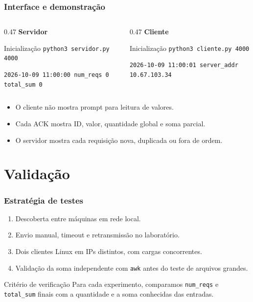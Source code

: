 \documentclass{beamer}
\begin{document}
\begin{frame}
  \frametitle{Interface e demonstração}
  \begin{columns}[T]
    \begin{column}{0.47\textwidth}
      \textbf{Servidor}
      \begin{exampleblock}{Inicialização}
        \texttt{python3 servidor.py 4000}
      \end{exampleblock}
      \small
      \texttt{2026-10-09 11:00:00 num\_reqs 0 total\_sum 0}
    \end{column}
    \begin{column}{0.47\textwidth}
      \textbf{Cliente}
      \begin{exampleblock}{Inicialização}
        \texttt{python3 cliente.py 4000}
      \end{exampleblock}
      \small
      \texttt{2026-10-09 11:00:01 server\_addr 10.67.103.34}
    \end{column}
  \end{columns}

  \vspace{1em}
  \begin{itemize}
    \item O cliente não mostra prompt para leitura de valores.
    \item Cada ACK mostra ID, valor, quantidade global e soma parcial.
    \item O servidor mostra cada requisição nova, duplicada ou fora de ordem.
  \end{itemize}
\end{frame}

\section{Validação}

\begin{frame}
  \frametitle{Estratégia de testes}
  \begin{enumerate}
    \item Descoberta entre máquinas em rede local.
    \item Envio manual, timeout e retransmissão no laboratório.
    \item Dois clientes Linux em IPs distintos, com cargas concorrentes.
    \item Validação da soma independente com \texttt{awk} antes do teste de arquivos grandes.
  \end{enumerate}

  \vspace{1em}
  \begin{block}{Critério de verificação}
    Para cada experimento, comparamos \texttt{num\_reqs} e \texttt{total\_sum} finais com a quantidade e a soma conhecidas das entradas.
  \end{block}
\end{frame}
\end{document}
